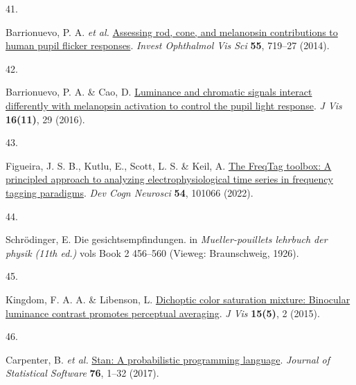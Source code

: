 \documentclass[
]{article}
\newlength{\cslhangindent}
\newlength{\csllabelwidth}
\newlength{\cslentryspacingunit} %
\newenvironment{CSLReferences}[2] %
 {%
  \setlength{\parindent}{0pt}
  \ifodd #1
  \let\oldpar\par
  \def\par{\hangindent=\cslhangindent\oldpar}
  \fi
  \setlength{\parskip}{#2\cslentryspacingunit}
 }%
 {}
\newcommand{\CSLLeftMargin}[1]{\parbox[t]{\csllabelwidth}{#1}}
\newcommand{\CSLRightInline}[1]{\parbox[t]{\linewidth - \csllabelwidth}{#1}\break}
\begin{document}
\begin{CSLReferences}{0}{0}
\leavevmode{}%
\CSLLeftMargin{41. }%
\CSLRightInline{Barrionuevo, P. A. \emph{et al.} \href{https://doi.org/10.1167/iovs.13-13252}{Assessing rod, cone, and melanopsin contributions to human pupil flicker responses}. \emph{Invest Ophthalmol Vis Sci} \textbf{55}, 719--27 (2014).}

\leavevmode{}%
\CSLLeftMargin{42. }%
\CSLRightInline{Barrionuevo, P. A. \& Cao, D. \href{https://doi.org/10.1167/16.11.29}{Luminance and chromatic signals interact differently with melanopsin activation to control the pupil light response}. \emph{J Vis} \textbf{16(11)}, 29 (2016).}

\leavevmode{}%
\CSLLeftMargin{43. }%
\CSLRightInline{Figueira, J. S. B., Kutlu, E., Scott, L. S. \& Keil, A. \href{https://doi.org/10.1016/j.dcn.2022.101066}{The FreqTag toolbox: A principled approach to analyzing electrophysiological time series in frequency tagging paradigms}. \emph{Dev Cogn Neurosci} \textbf{54}, 101066 (2022).}

\leavevmode{}%
\CSLLeftMargin{44. }%
\CSLRightInline{Schrödinger, E. Die gesichtsempfindungen. in \emph{Mueller-pouillets lehrbuch der physik (11th ed.)} vols Book 2 456--560 (Vieweg: Braunschweig, 1926).}

\leavevmode{}%
\CSLLeftMargin{45. }%
\CSLRightInline{Kingdom, F. A. A. \& Libenson, L. \href{https://doi.org/10.1167/15.5.2}{Dichoptic color saturation mixture: Binocular luminance contrast promotes perceptual averaging}. \emph{J Vis} \textbf{15(5)}, 2 (2015).}

\leavevmode{}%
\CSLLeftMargin{46. }%
\CSLRightInline{Carpenter, B. \emph{et al.} \href{https://doi.org/10.18637/jss.v076.i01}{Stan: A probabilistic programming language}. \emph{Journal of Statistical Software} \textbf{76}, 1--32 (2017).}

\end{CSLReferences}
\end{document}
